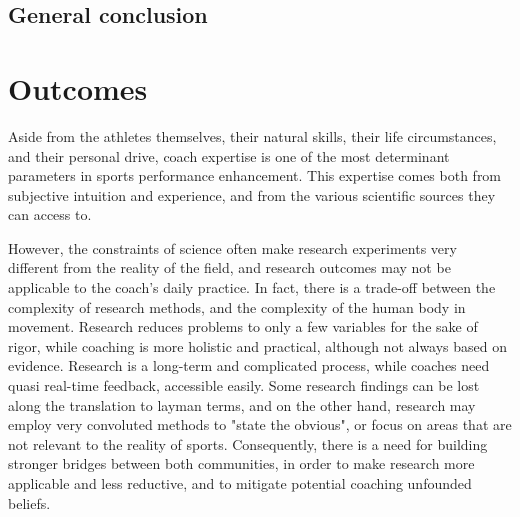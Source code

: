 

{} \mtcaddchapter
{}

\vspace*{-1cm}
\begin{flushright}
\section*{\fontsize{20pt}{20pt}\selectfont\textnormal{General conclusion}}
\end{flushright}
\vspace{2cm}

\chead[\fancyplain{}{}]
      {\fancyplain{}{}}
\lfoot[\fancyplain{}{}]
      {\fancyplain{}{}}
\cfoot[\fancyplain{}{\thepage}]
      {\fancyplain{}{\thepage}}
\rfoot[\fancyplain{}{}]
     {\fancyplain{}{\scriptsize}}


\section*{Outcomes}

Aside from the athletes themselves, their natural skills, their life circumstances, and their personal drive, coach expertise is one of the most determinant parameters in sports performance enhancement. This expertise comes both from subjective intuition and experience, and from the various scientific sources they can access to. 

However, the constraints of science often make research experiments very different from the reality of the field, and research outcomes may not be applicable to the coach's daily practice. In fact, there is a trade-off between the complexity of research methods, and the complexity of the human body in movement. Research reduces problems to only a few variables for the sake of rigor, while coaching is more holistic and practical, although not always based on evidence. Research is a long-term and complicated process, while coaches need quasi real-time feedback, accessible easily. Some research findings can be lost along the translation to layman terms, and on the other hand, research may employ very convoluted methods to "state the obvious", or focus on areas that are not relevant to the reality of sports. Consequently, there is a need for building stronger bridges between both communities, in order to make research more applicable and less reductive, and to mitigate potential coaching unfounded beliefs.

